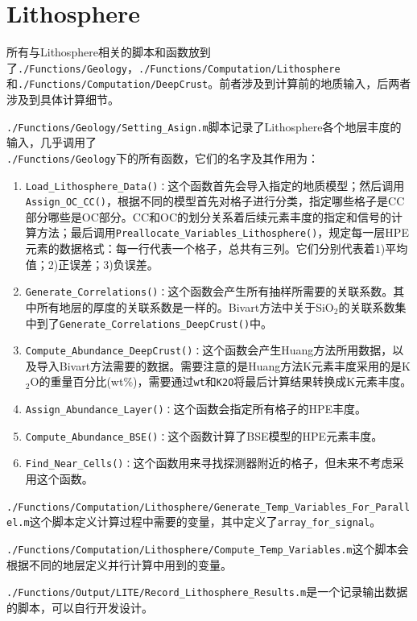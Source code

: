 		\section{Lithosphere}
			所有与Lithosphere相关的脚本和函数放到了\texttt{./Functions/Geology}，\texttt{./Functions/Computation/Lithosphere}和\texttt{./Functions/Computation/DeepCrust}。前者涉及到计算前的地质输入，后两者涉及到具体计算细节。\par
			\texttt{./Functions/Geology/Setting\_Asign.m}脚本记录了Lithosphere各个地层丰度的输入，几乎调用了\\
			\texttt{./Functions/Geology}下的所有函数，它们的名字及其作用为：
				\begin{enumerate}
					\item \texttt{Load\_Lithosphere\_Data()：}这个函数首先会导入指定的地质模型；然后调用\texttt{Assign\_OC\_CC()}，根据不同的模型首先对格子进行分类，指定哪些格子是CC部分哪些是OC部分。CC和OC的划分关系着后续元素丰度的指定和信号的计算方法；最后调用\texttt{Preallocate\_Variables\_Lithosphere()}，规定每一层HPE元素的数据格式：每一行代表一个格子，总共有三列。它们分别代表着1)平均值；2)正误差；3)负误差。
					\item \texttt{Generate\_Correlations()：}这个函数会产生所有抽样所需要的关联系数。其中所有地层的厚度的关联系数是一样的。Bivart方法中关于SiO${}_2$的关联系数集中到了\texttt{Generate\_Correlations\_DeepCrust()}中。
					\item \texttt{Compute\_Abundance\_DeepCrust()：}这个函数会产生Huang方法所用数据，以及导入Bivart方法需要的数据。需要注意的是Huang方法K元素丰度采用的是K${}_2$O的重量百分比(wt\%)，需要通过\texttt{wt}和\texttt{K2O}将最后计算结果转换成K元素丰度。
					\item \texttt{Assign\_Abundance\_Layer()：}这个函数会指定所有格子的HPE丰度。
					\item \texttt{Compute\_Abundance\_BSE()：}这个函数计算了BSE模型的HPE元素丰度。
					\item \texttt{Find\_Near\_Cells()：}这个函数用来寻找探测器附近的格子，但未来不考虑采用这个函数。
				\end{enumerate}
			\par
			\texttt{./Functions/Computation/Lithosphere/Generate\_Temp\_Variables\_For\_Parallel.m}这个脚本定义计算过程中需要的变量，其中定义了\texttt{array\_for\_signal}。\par
			\texttt{./Functions/Computation/Lithosphere/Compute\_Temp\_Variables.m}这个脚本会根据不同的地层定义并行计算中用到的变量。\par
			\texttt{./Functions/Output/LITE/Record\_Lithosphere\_Results.m}是一个记录输出数据的脚本，可以自行开发设计。\par
